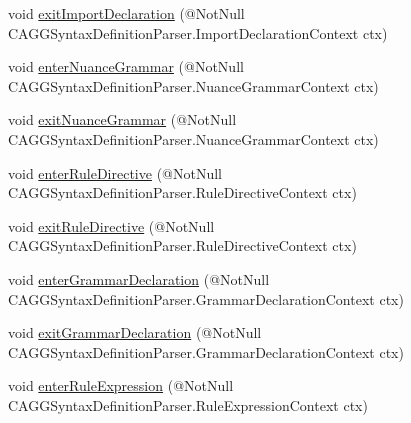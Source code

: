 \begin{DoxyCompactItemize}
\item 
void \hyperlink{interfaceit_1_1emarolab_1_1cagg_1_1core_1_1language_1_1parser_1_1ANTLRInterface_1_1ANTLRGenerate8f089aac366bd2683be460c907cc6185_aa0e9c6d774d99616b797ea94efe8ded8}{exit\-Import\-Declaration} (@Not\-Null C\-A\-G\-G\-Syntax\-Definition\-Parser.\-Import\-Declaration\-Context ctx)
\item 
void \hyperlink{interfaceit_1_1emarolab_1_1cagg_1_1core_1_1language_1_1parser_1_1ANTLRInterface_1_1ANTLRGenerate8f089aac366bd2683be460c907cc6185_a8ea382957c4a9cdf53ab4a4ff9fba30a}{enter\-Nuance\-Grammar} (@Not\-Null C\-A\-G\-G\-Syntax\-Definition\-Parser.\-Nuance\-Grammar\-Context ctx)
\item 
void \hyperlink{interfaceit_1_1emarolab_1_1cagg_1_1core_1_1language_1_1parser_1_1ANTLRInterface_1_1ANTLRGenerate8f089aac366bd2683be460c907cc6185_a5d326d40b94b65bcb686f207c634c13d}{exit\-Nuance\-Grammar} (@Not\-Null C\-A\-G\-G\-Syntax\-Definition\-Parser.\-Nuance\-Grammar\-Context ctx)
\item 
void \hyperlink{interfaceit_1_1emarolab_1_1cagg_1_1core_1_1language_1_1parser_1_1ANTLRInterface_1_1ANTLRGenerate8f089aac366bd2683be460c907cc6185_a4e0f02f5febccd5b803d7800252408ab}{enter\-Rule\-Directive} (@Not\-Null C\-A\-G\-G\-Syntax\-Definition\-Parser.\-Rule\-Directive\-Context ctx)
\item 
void \hyperlink{interfaceit_1_1emarolab_1_1cagg_1_1core_1_1language_1_1parser_1_1ANTLRInterface_1_1ANTLRGenerate8f089aac366bd2683be460c907cc6185_aa1a12931c51ad8a27197275714947a32}{exit\-Rule\-Directive} (@Not\-Null C\-A\-G\-G\-Syntax\-Definition\-Parser.\-Rule\-Directive\-Context ctx)
\item 
void \hyperlink{interfaceit_1_1emarolab_1_1cagg_1_1core_1_1language_1_1parser_1_1ANTLRInterface_1_1ANTLRGenerate8f089aac366bd2683be460c907cc6185_aa410a50f53c81b0c215b733d4ed155e2}{enter\-Grammar\-Declaration} (@Not\-Null C\-A\-G\-G\-Syntax\-Definition\-Parser.\-Grammar\-Declaration\-Context ctx)
\item 
void \hyperlink{interfaceit_1_1emarolab_1_1cagg_1_1core_1_1language_1_1parser_1_1ANTLRInterface_1_1ANTLRGenerate8f089aac366bd2683be460c907cc6185_a1393730b8d714e347bd7a4d22d73b8a0}{exit\-Grammar\-Declaration} (@Not\-Null C\-A\-G\-G\-Syntax\-Definition\-Parser.\-Grammar\-Declaration\-Context ctx)
\item 
void \hyperlink{interfaceit_1_1emarolab_1_1cagg_1_1core_1_1language_1_1parser_1_1ANTLRInterface_1_1ANTLRGenerate8f089aac366bd2683be460c907cc6185_ae830cb9844c7afea3e5c9afb4dbe9a03}{enter\-Rule\-Expression} (@Not\-Null C\-A\-G\-G\-Syntax\-Definition\-Parser.\-Rule\-Expression\-Context ctx)

\end{DoxyCompactItemize}
